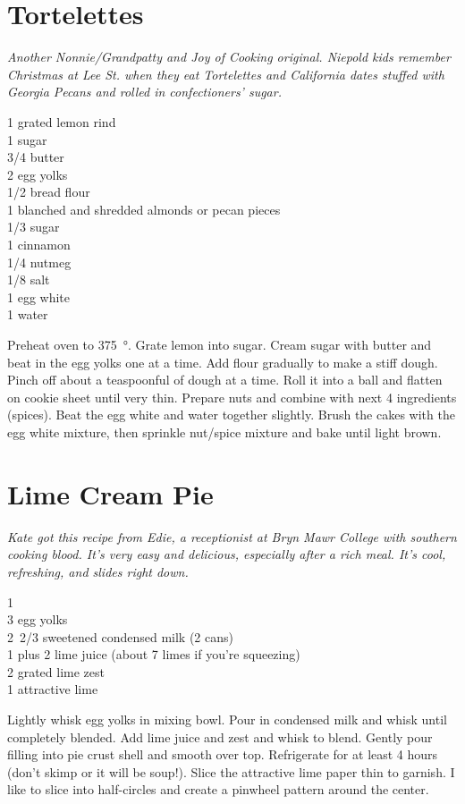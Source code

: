 \section{Tortelettes}

\textit{Another Nonnie/Grandpatty and Joy of Cooking original. Niepold kids
  remember Christmas at Lee St. when they eat Tortelettes and California dates
  stuffed with Georgia Pecans and rolled in confectioners' sugar.}
\begin{ingredients}
  1 grated lemon rind\\
  \SI{1}{\cup} sugar\\
  \SI{3/4}{\cup} butter\\
  2 egg yolks \\
  \SI{1/2}{\cup} bread flour \\
  \SI{1}{\cup} blanched and shredded almonds or pecan pieces \\
  \SI{1/3}{\cup} sugar \\
  \SI{1}{\teaspoon} cinnamon\\
  \SI{1/4}{\teaspoon} nutmeg\\
  \SI{1/8}{\teaspoon} salt\\
  1 egg white\\
  \SI{1}{\tblspoon} water
\end{ingredients}
Preheat oven to \SI{375}{\degree}. Grate lemon into sugar. Cream sugar with
butter and beat in the egg yolks one at a time. Add flour gradually to make a
stiff dough. Pinch off about a teaspoonful of dough at a time. Roll it into a
ball and flatten on cookie sheet until very thin. Prepare nuts and combine
with next 4 ingredients (spices). Beat the egg white and water together
slightly.  Brush the cakes with the egg white mixture, then sprinkle nut/spice
mixture and bake until light brown.

\section{Lime Cream Pie}

\textit{Kate got this recipe from Edie, a receptionist at Bryn Mawr College
  with southern cooking blood.  It's very easy and delicious, especially after
  a rich meal. It's cool, refreshing, and slides right down.}
\begin{ingredients}
  1 \\
  3 egg yolks\\
  \SI{2/3}[2]{\cup} sweetened condensed milk (2 cans)\\
  \SI{1}{\cup} plus \SI{2}{\tblspoon} lime juice (about 7 limes if you're
  squeezing)\\
  \SI{2}{\teaspoon} grated lime zest\\
  1 attractive lime
\end{ingredients}
Lightly whisk egg yolks in mixing bowl. Pour in condensed milk and whisk until
completely blended.  Add lime juice and zest and whisk to blend. Gently pour
filling into pie crust shell and smooth over top.  Refrigerate for at least 4
hours (don't skimp or it will be soup!). Slice the attractive lime paper thin
to garnish. I like to slice into half-circles and create a pinwheel pattern
around the center.
